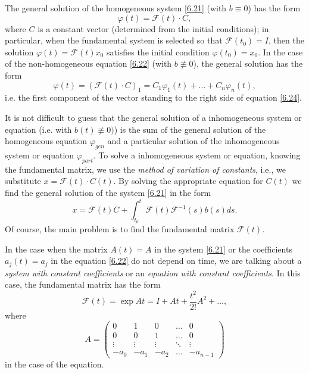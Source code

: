 The general solution of the homogeneous system \eqref{6.21} (with $b \equiv 0$) has the form
\begin{equation}
\label{6.24}
\varphi (t)=\mathcal{F}(t)\cdot C,
\end{equation}
where $C$ is a constant vector (determined from the initial conditions); in particular, when the fundamental system is selected so that $\mathcal{F}(t_{0})=I$, then the solution $\varphi (t)=\mathcal{F}(t)x_{0}$ satisfies the initial condition $\varphi (t_{0})=x_{0}$. In the case of the non-homogeneous equation \eqref{6.22} (with $b \not \equiv 0$), the general solution has the form
$$
\varphi (t)=\left( \mathcal{F}(t)\cdot C\right) _{1}=C_{1}\varphi
_{1}(t)+\ldots +C_{n}\varphi _{n}(t),
$$
i.e. the first component of the vector standing to the right side of equation \eqref{6.24}.

It is not difficult to guess that the general solution of a inhomogeneous system or equation (i.e. with $b(t)\not\equiv 0)$) is the sum of the general solution of the homogeneous equation $\varphi _{gen}$ and a particular solution of the inhomogeneous system or equation $\varphi _{part}$. To solve a inhomogeneous system or equation, knowing the fundamental matrix, we use the \emph{method of variation of constants}, i.e., we substitute $x = \mathcal{F}(t) \cdot C(t)$. By solving the appropriate equation for $C(t)$ we find the general solution of the system \eqref{6.21} in the form
$$
x=\mathcal{F}(t)C+\int_{t_{0}}^{t}\mathcal{F}(t)\mathcal{F}^{-1}(s)b(s)ds.
$$
Of course, the main problem is to find the fundamental matrix $\mathcal{F} (t)$.

In the case when the matrix $A (t) = A$ in the system \eqref{6.21} or the coefficients $a_j (t) = a_j$ in the equation \eqref{6.22} do not depend on time, we are talking about a \emph{system with constant coefficients} or an \emph{equation with constant coefficients}. In this case, the fundamental matrix has the form
$$
\mathcal{F}(t)=\exp At=I+At+\frac{t^{2}}{2!}A^{2}+\ldots ,
$$
where
$$
A=\left(
\begin{array}{ccccc}
0 & 1 & 0 & \ldots & 0 \\
0 & 0 & 1 & \ldots & 0 \\
\vdots & \vdots & \vdots & \ddots & \vdots \\
-a_{0} & -a_{1} & -a_{2} & \ldots & -a_{n-1}%
\end{array}%
\right)
$$
in the case of the equation.

